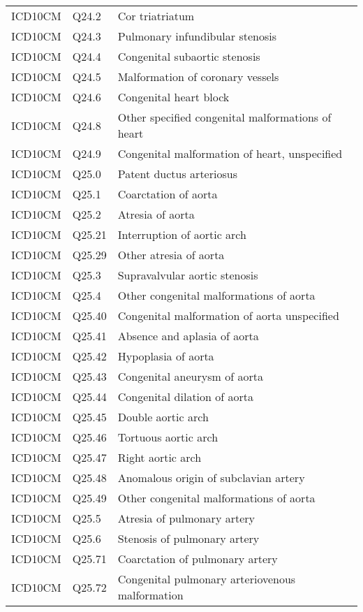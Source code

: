 \begin{longtable}{p{}p{}p{}}
  ICD10CM & Q24.2 & Cor triatriatum \\ 
  ICD10CM & Q24.3 & Pulmonary infundibular stenosis \\ 
  ICD10CM & Q24.4 & Congenital subaortic stenosis \\ 
  ICD10CM & Q24.5 & Malformation of coronary vessels \\ 
  ICD10CM & Q24.6 & Congenital heart block \\ 
  ICD10CM & Q24.8 & Other specified congenital malformations of heart \\ 
  ICD10CM & Q24.9 & Congenital malformation of heart, unspecified \\ 
  ICD10CM & Q25.0 & Patent ductus arteriosus \\ 
  ICD10CM & Q25.1 & Coarctation of aorta \\ 
  ICD10CM & Q25.2 & Atresia of aorta \\ 
  ICD10CM & Q25.21 & Interruption of aortic arch \\ 
  ICD10CM & Q25.29 & Other atresia of aorta \\ 
  ICD10CM & Q25.3 & Supravalvular aortic stenosis \\ 
  ICD10CM & Q25.4 & Other congenital malformations of aorta \\ 
  ICD10CM & Q25.40 & Congenital malformation of aorta unspecified \\ 
  ICD10CM & Q25.41 & Absence and aplasia of aorta \\ 
  ICD10CM & Q25.42 & Hypoplasia of aorta \\ 
  ICD10CM & Q25.43 & Congenital aneurysm of aorta \\ 
  ICD10CM & Q25.44 & Congenital dilation of aorta \\ 
  ICD10CM & Q25.45 & Double aortic arch \\ 
  ICD10CM & Q25.46 & Tortuous aortic arch \\ 
  ICD10CM & Q25.47 & Right aortic arch \\ 
  ICD10CM & Q25.48 & Anomalous origin of subclavian artery \\ 
  ICD10CM & Q25.49 & Other congenital malformations of aorta \\ 
  ICD10CM & Q25.5 & Atresia of pulmonary artery \\ 
  ICD10CM & Q25.6 & Stenosis of pulmonary artery \\ 
  ICD10CM & Q25.71 & Coarctation of pulmonary artery \\ 
  ICD10CM & Q25.72 & Congenital pulmonary arteriovenous malformation \\ 

\end{longtable}
